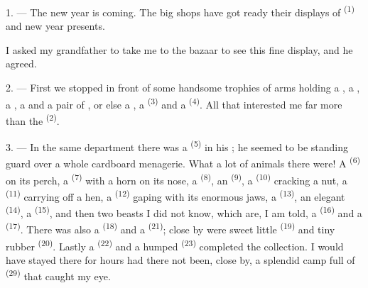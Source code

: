 %

\VUsaut{4.0mm}
\VUsaut{2.0mm}
\VUsaut{3.4mm}

1. --- The new year is coming. The big shops have got ready their displays
of  \textsuperscript{(1)} and new year presents.

I asked my grandfather to take me to the bazaar to see this fine display,
and he agreed.

2. --- First we stopped in front of some handsome trophies of arms holding
a , a , a , a 
and a pair of , or else a , a
 \textsuperscript{(3)} and a  \textsuperscript{(4)}. All that
interested me far more than the  \textsuperscript{(2)}.

\VUsaut{3.0mm}
\VUsaut{2.6mm}

3. --- In the same department there was a  \textsuperscript{(5)} in his
; he seemed to be standing guard over a whole cardboard
menagerie. What a lot of animals there were! A  \textsuperscript{(6)} on
its perch, a  \textsuperscript{(7)} with a horn on its nose, a
 \textsuperscript{(8)}, an  \textsuperscript{(9)}, a 
\textsuperscript{(10)} cracking a nut, a  \textsuperscript{(11)} carrying off a hen, a
 \textsuperscript{(12)} gaping with its enormous jaws, a
 \textsuperscript{(13)}, an elegant  \textsuperscript{(14)}, a
 \textsuperscript{(15)}, and then two beasts I did not know, which are, I
am told, a  \textsuperscript{(16)} and a  \textsuperscript{(17)}. There
was also a  \textsuperscript{(18)} and a  \textsuperscript{(21)}; close
by were sweet little  \textsuperscript{(19)} and tiny rubber 
\textsuperscript{(20)}. Lastly a  \textsuperscript{(22)} and a humped
 \textsuperscript{(23)} completed the collection. I would have stayed
there for hours had there not been, close by, a splendid camp full of
 \textsuperscript{(29)} that caught my eye.

